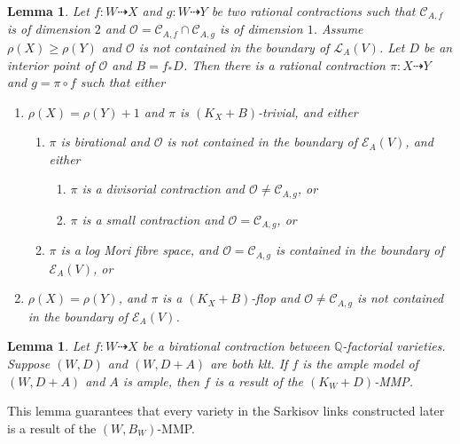 \documentclass[11pt]{amsart}
\newtheorem{lem}[defn]{Lemma}
\begin{document}
\begin{lem}\label{mapbetweenAM2}
  \cite[Lemma 3.5]{haconSarkisovProgram2012} Let $ f:W\dashrightarrow X $ and $ g:W\dashrightarrow  Y $ be two rational contractions such that $ \mathcal{C}_{A,f} $ is of dimension $ 2 $ and $ \mathcal{O}=\mathcal{C}_{A,f}\cap \mathcal{C}_{A,g} $ is of dimension $ 1 $. Assume $ \rho(X)\geqslant \rho(Y) $ and $ \mathcal{O} $ is not contained in the boundary of $ \mathcal{L}_{A}(V) $. Let $ D $ be an interior point of $ \mathcal{O} $ and $ B=f_*D $. Then there is a rational contraction $ \pi:X\dashrightarrow Y $ and $ g=\pi\circ f $ such that either
  \begin{enumerate}
    \item $ \rho(X)=\rho(Y)+1 $ and $ \pi  $ is $ (K_X+B) $-trivial, and either
          \begin{enumerate}
            \item $ \pi $ is birational and $ \mathcal{O} $ is not contained in the boundary of $ \mathcal{E}_A(V) $, and either
                  \begin{enumerate}
                    \item $ \pi $ is a divisorial contraction and $ \mathcal{O}\neq \mathcal{C}_{A,g} $, or
                    \item $ \pi $ is a small contraction and $ \mathcal{O}= \mathcal{C}_{A,g} $, or
                  \end{enumerate}
            \item $ \pi $ is a log Mori fibre space, and $ \mathcal{O}=\mathcal{C}_{A,g} $ is contained in the boundary of $ \mathcal{E}_{A}(V) $, or
          \end{enumerate}
    \item $ \rho(X)=\rho(Y) $, and $ \pi $ is  a $ (K_X+B) $-flop and $ \mathcal{O}\neq\mathcal{C}_{A,g} $ is not contained in the boundary of $ \mathcal{E}_A(V) $.
  \end{enumerate}
\end{lem}

\begin{lem}
  \cite[Lemma 3.6]{haconSarkisovProgram2012} Let $f:W\dashrightarrow X $ be a birational contraction between $\mathbb{Q}$-factorial varieties. Suppose $(W,D)$ and $(W,D+A)$ are both klt. If $f$ is the ample model of $(W,D+A)$ and $A$ is ample, then $f$ is a result of the  $(K_{W}+D)$-MMP.
\end{lem}

This lemma guarantees that every variety in the Sarkisov links constructed later is a result of the $(W, B_{W})$-MMP.
\end{document}
